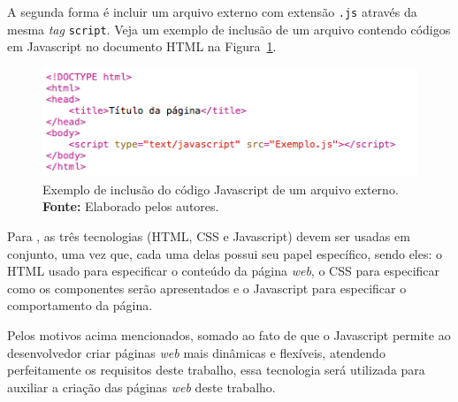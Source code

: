 A segunda forma é incluir um arquivo externo com extensão \texttt{.js} através da mesma \textit{tag} \texttt{script}. Veja um exemplo de inclusão de um arquivo contendo códigos em Javascript no documento HTML na Figura~\ref{fig:javascript_externo}.

\begin{figure}[h!]
	\centerline{\includegraphics[scale=0.8]{./imagens/javascript_include.png}}
	\caption[Exemplo de inclusão do código Javascript de um arquivo externo]
	{Exemplo de inclusão do código Javascript de um arquivo externo. \textbf{Fonte:} Elaborado pelos autores.}
	\label{fig:javascript_externo}
\end{figure}

Para , as três tecnologias (HTML, CSS e Javascript) devem ser usadas em conjunto, uma vez que, cada uma delas possui seu papel específico, sendo eles: o HTML usado para especificar o conteúdo da página \textit{web}, o CSS para especificar como os componentes serão apresentados e o Javascript para especificar o comportamento da página.

Pelos motivos acima mencionados, somado ao fato de que o Javascript permite ao desenvolvedor criar páginas \textit{web} mais dinâmicas e flexíveis, atendendo perfeitamente os requisitos deste trabalho, essa tecnologia será utilizada para auxiliar a criação das páginas \textit{web} deste trabalho.